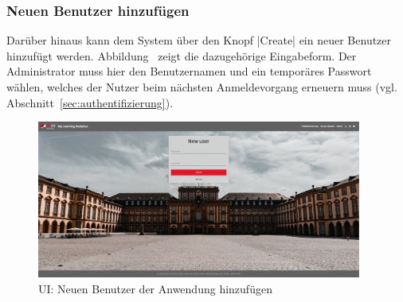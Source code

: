 \subsubsection*{Neuen Benutzer hinzufügen \faUsers}

Darüber hinaus kann dem System über den Knopf \jinline|Create| ein neuer Benutzer hinzufügt werden.
Abbildung~ zeigt die dazugehörige Eingabeform.
Der Administrator muss hier den Benutzernamen und ein temporäres Passwort wählen, welches der Nutzer beim nächsten Anmeldevorgang erneuern muss (vgl. Abschnitt~\vref{sec:authentifizierung}).

\begin{figure}[h]
	\centering
	\includegraphics[width=0.95\textwidth, keepaspectratio]{img/client/AdminCreateUser.png}
	\captionsetup{justification=centering, format=plain}
	\caption[\acl{UI}: Neuen Benutzer der Anwendung hinzufügen]{\acl{UI}: Neuen Benutzer der Anwendung hinzufügen \\ \quelleScreenshot}
	\label{fig:AdminCreateUserImplement}
\end{figure}
